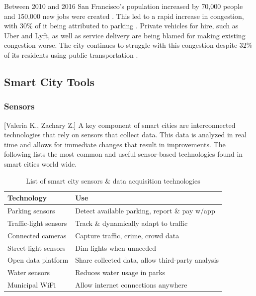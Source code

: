 \documentclass[12pt]{article}                       %
\begin{document}
Between 2010 and 2016 San Francisco's population increased by 70,000 people and 150,000 new jobs were created \cite{Marshall2018UberComplicated}. This led to a rapid increase in congestion, with 30\% of it being attributed to parking \cite{Marshall2018UberComplicated}. Private vehicles for hire, such as Uber and Lyft, as well as service delivery are being blamed for making existing congestion worse. The city continues to struggle with this congestion despite 32\% of its residents using public transportation \cite{Marshall2018UberComplicated}. 

\subsection{Smart City Tools} 
\subsubsection{Sensors}[Valeria K., Zachary Z.] \label{sec:smart_city_sensors}
A key component of smart cities are interconnected technologies that rely on sensors that collect data. This data is analyzed in real time and allows for immediate changes that result in improvements. The following lists the most common and useful sensor-based technologies found in smart cities world wide. 

\begin{table}[H]
    \centering
    \small
    \begin{tabular}{l|l}
        \textbf{Technology} & \textbf{Use} \\
        \hline{}
        
        Parking sensors &
        Detect available parking, report \& pay w/app \\
        \hline{}
        
        Traffic-light sensors &
        Track \& dynamically adapt to traffic \\
        \hline{}
        
        Connected cameras &
        Capture traffic, crime, crowd data \\
        \hline{}
        
        Street-light sensors &
        Dim lights when unneeded \\
        \hline{}
        
        Open data platform &
        Share collected data, allow third-party analysis \\
        \hline{}
        
        Water sensors &
        Reduces water usage in parks \\
        \hline{}
        
        Municipal WiFi &
        Allow internet connections anywhere
    \end{tabular}
    \caption{List of smart city sensors \& data acquisition technologies}
    \label{tab:smart_city_sensors}
\end{table}
\end{document}
